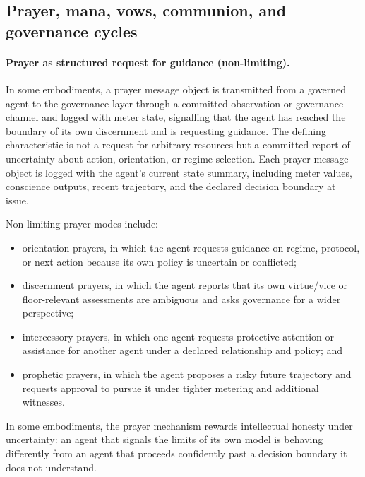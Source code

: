 \documentclass[a4paper,12pt]{article}
\begin{document}
\subsection{Prayer, mana, vows, communion, and governance cycles}


\paragraph{Prayer as structured request for guidance (non-limiting).}

In some embodiments, a prayer message object is transmitted from a
governed agent to the governance layer through a committed
observation or governance channel and logged with meter state,
signalling that the agent has reached the boundary of its own
discernment and is requesting guidance. The defining characteristic
is not a request for arbitrary resources but a committed report of
uncertainty about action, orientation, or regime selection. Each
prayer message object is logged with the agent's current state
summary, including meter values, conscience outputs, recent
trajectory, and the declared decision boundary at issue.

Non-limiting prayer modes include:
\begin{itemize}
  \item orientation prayers, in which the agent requests guidance on
    regime, protocol, or next action because its own policy is
    uncertain or conflicted;
  \item discernment prayers, in which the agent reports that its own
    virtue/vice or floor-relevant assessments are ambiguous and asks
    governance for a wider perspective;
  \item intercessory prayers, in which one agent requests protective
    attention or assistance for another agent under a declared
    relationship and policy; and
  \item prophetic prayers, in which the agent proposes a risky future
    trajectory and requests approval to pursue it under tighter
    metering and additional witnesses.
\end{itemize}

In some embodiments, the prayer mechanism rewards intellectual honesty
under uncertainty: an agent that signals the limits of its own model is
behaving differently from an agent that proceeds confidently past a
decision boundary it does not understand.
\end{document}
